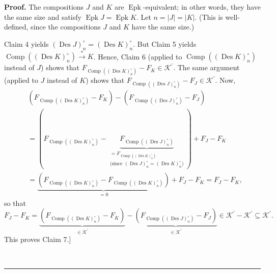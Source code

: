 \documentclass[numbers=enddot,12pt,final,onecolumn,notitlepage]{scrartcl}%
\theoremstyle{definition}
\newenvironment{proof}[1][Proof]{\noindent\textbf{#1.} }{\ \rule{0.5em}{0.5em}}
\newenvironment{verlong}{}{}
\begin{document}
\begin{verlong}
\begin{proof}
The compositions $J$ and $K$ are $\operatorname{Epk}$-equivalent; in other
words, they have the same size and satisfy $\operatorname{Epk}%
J=\operatorname{Epk}K$. Let $n=\left\vert J\right\vert =\left\vert
K\right\vert $. (This is well-defined, since the compositions $J$ and $K$ have
the same size.)

Claim 4 yields $\left(  \operatorname{Des}J\right)  _{n}^{\circ}=\left(
\operatorname{Des}K\right)  _{n}^{\circ}$. But Claim 5 yields
$\operatorname*{Comp}\left(  \left(  \operatorname{Des}K\right)  _{n}^{\circ
}\right)  \overset{\ast}{\rightarrow}K$. Hence, Claim 6 (applied to
$\operatorname*{Comp}\left(  \left(  \operatorname{Des}K\right)  _{n}^{\circ
}\right)  $ instead of $J$) shows that \newline
$F_{\operatorname*{Comp}\left(  \left(
\operatorname{Des}K\right)  _{n}^{\circ}\right)  }-F_{K}\in\mathcal{K}%
^{\prime}$. The same argument (applied to $J$ instead of $K$) shows that
$F_{\operatorname*{Comp}\left(  \left(  \operatorname{Des}J\right)
_{n}^{\circ}\right)  }-F_{J}\in\mathcal{K}^{\prime}$. Now,%
\begin{align*}
&  \left(  F_{\operatorname*{Comp}\left(  \left(  \operatorname{Des}K\right)
_{n}^{\circ}\right)  }-F_{K}\right)  -\left(  F_{\operatorname*{Comp}\left(
\left(  \operatorname{Des}J\right)  _{n}^{\circ}\right)  }-F_{J}\right) \\
&  =\left(  F_{\operatorname*{Comp}\left(  \left(  \operatorname{Des}%
K\right)  _{n}^{\circ}\right)  }-\underbrace{F_{\operatorname*{Comp}\left(
\left(  \operatorname{Des}J\right)  _{n}^{\circ}\right)  }}%
_{\substack{=F_{\operatorname*{Comp}\left(  \left(  \operatorname{Des}%
K\right)  _{n}^{\circ}\right)  }\\\text{(since }\left(  \operatorname{Des}%
J\right)  _{n}^{\circ}=\left(  \operatorname{Des}K\right)  _{n}^{\circ
}\text{)}}}\right)  +F_{J}-F_{K}\\
&  =\underbrace{\left(  F_{\operatorname*{Comp}\left(  \left(
\operatorname{Des}K\right)  _{n}^{\circ}\right)  }-F_{\operatorname*{Comp}%
\left(  \left(  \operatorname{Des}K\right)  _{n}^{\circ}\right)  }\right)
}_{=0}+F_{J}-F_{K}=F_{J}-F_{K},
\end{align*}
so that%
\[
F_{J}-F_{K}=\underbrace{\left(  F_{\operatorname*{Comp}\left(  \left(
\operatorname{Des}K\right)  _{n}^{\circ}\right)  }-F_{K}\right)  }%
_{\in\mathcal{K}^{\prime}}-\underbrace{\left(  F_{\operatorname*{Comp}\left(
\left(  \operatorname{Des}J\right)  _{n}^{\circ}\right)  }-F_{J}\right)
}_{\in\mathcal{K}^{\prime}}\in\mathcal{K}^{\prime}-\mathcal{K}^{\prime
}\subseteq\mathcal{K}^{\prime}.
\]
This proves Claim 7.]


\end{proof}
\end{verlong}
\end{document}
